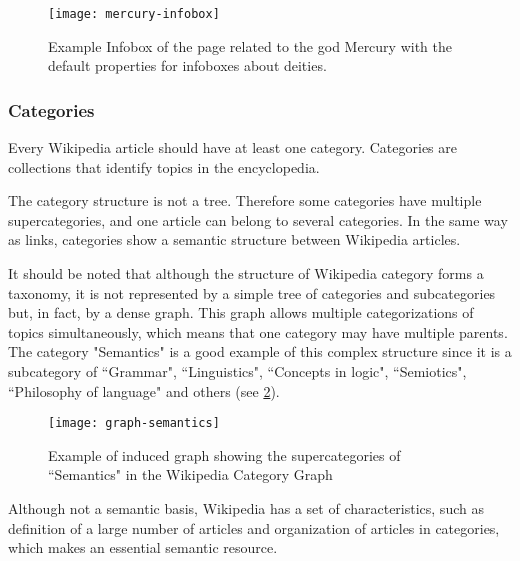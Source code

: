 \begin{figure}[!h]
\centering
  \texttt{[image: mercury-infobox]}
  \caption{Example Infobox of the page related to the god Mercury with the default properties for infoboxes about deities.}
  \label{fig:mercury-infobox}
\end{figure}



\subsubsection{\hspace*{3pt} Categories}

Every Wikipedia article should have at least one category. Categories are collections that identify topics in the encyclopedia. 

The category structure is not a tree. Therefore some categories have multiple supercategories, and one article can belong to several categories. In the same way as links, categories show a semantic structure between Wikipedia articles. 

It should be noted that although the structure of Wikipedia category forms a taxonomy, it is not represented by a simple tree of categories and subcategories but, in fact, by a dense graph. This graph allows multiple categorizations of topics simultaneously, which means that one category may have multiple parents. The category "Semantics" is a good example of this complex structure since it is a subcategory of ``Grammar",  ``Linguistics", ``Concepts in logic", ``Semiotics", ``Philosophy of language" and others (see \ref{fig:semantics-category}).


\begin{figure}[H]
\centering
  \texttt{[image: graph-semantics]}
  \caption{Example of induced graph showing the supercategories of ``Semantics" in the Wikipedia Category Graph}
  \label{fig:semantics-category}
\end{figure}

Although not a semantic basis, Wikipedia has a set of characteristics, such as definition of a large number of articles and organization of articles in categories, which makes an essential semantic resource.

